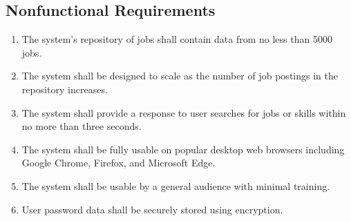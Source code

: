 \documentclass[titlepage]{article}
\def\threedigits#1{%
\ifnum#1<100 0\fi 
\ifnum#1<10 0\fi 
\number#1}
\begin{document}
\subsection{Nonfunctional Requirements}

\begin{enumerate}[label={\textbf{NFR\protect\threedigits{\theenumi}}}, leftmargin = *]
    \item The system's repository of jobs shall contain data from no less than 5000 jobs.
    \item The system shall be designed to scale as the number of job postings in the repository increases.
    \item The system shall provide a response to user searches for jobs or skills within no more than three seconds.
    \item The system shall be fully usable on popular desktop web browsers including Google Chrome, Firefox, and Microsoft Edge.
    \item The system shall be usable by a general audience with minimal training.
    \item User password data shall be securely stored using encryption.
\end{enumerate}
\end{document}
